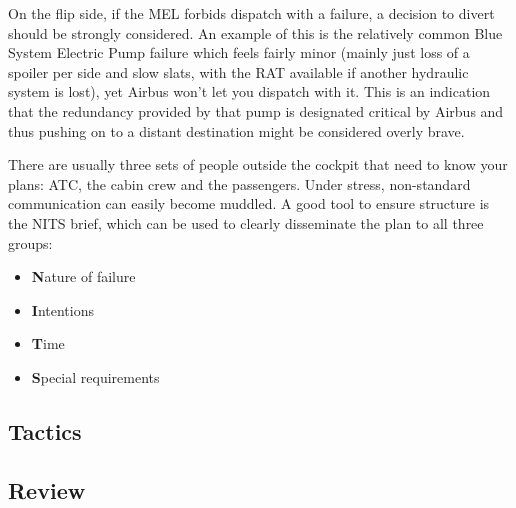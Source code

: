\documentclass[a5paper,11pt,titlepage]{article}
\begin{document}
On the flip side, if the MEL forbids dispatch with a failure, a decision
to divert should be strongly considered. An example of this is the
relatively common Blue System Electric Pump failure which feels fairly
minor (mainly just loss of a spoiler per side and slow slats, with the
RAT available if another hydraulic system is lost), yet Airbus won't let
you dispatch with it. This is an indication that the redundancy provided
by that pump is designated critical by Airbus and thus pushing on to
a distant destination might be considered overly brave.

There are usually three sets of people outside the cockpit that need to
know your plans: ATC, the cabin crew and the passengers. Under stress,
non-standard communication can easily become muddled. A good tool to
ensure structure is the NITS brief, which can be used to clearly
disseminate the plan to all three groups:

\begin{itemize}
\item \textbf{N}ature of failure
\item \textbf{I}ntentions
\item \textbf{T}ime
\item \textbf{S}pecial requirements
\end{itemize}

\subsection{Tactics}
\subsection{Review}
\end{document}
